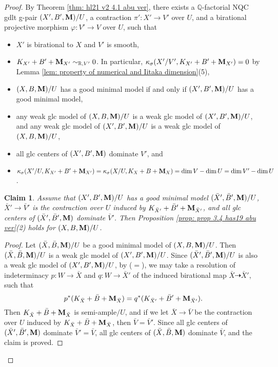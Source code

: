 \documentclass[11pt]{amsart}
\numberwithin{equation}{section}
\newcommand{\Mm}{{\bf{M}}}
\newcommand{\Qq}{\mathbb{Q}}
\newtheorem{claim}[thm]{Claim}
\theoremstyle{definition}
\theoremstyle{definition}
\theoremstyle{definition}
\begin{document}
\begin{proof}
By Theorem \ref{thm: hl21 v2 4.1 abu ver}, there exists a $\Qq$-factorial NQC gdlt g-pair $(X',B',\Mm)/U$, a contraction $\pi': X'\rightarrow V'$ over $U$, and a birational projective morphism $\varphi: V'\rightarrow V$ over $U$, such that 
\begin{itemize}
    \item $X'$ is birational to $X$ and $V'$ is smooth,
    \item $K_{X'}+B'+\Mm_{X'}\sim_{\mathbb R,V'}0$. In particular, $\kappa_{\sigma}(X'/V',K_{X'}+B'+\Mm_{X'})=0$ by Lemma \ref{lem: property of numerical and Iitaka dimension}(5),
    \item $(X,B,\Mm)/U$ has a good minimal model if and only if $(X',B',\Mm)/U$ has a good minimal model,
    \item any weak glc model of $(X,B,\Mm)/U$ is a weak glc model of $(X',B',\Mm)/U$, and any weak glc model of $(X',B',\Mm)/U$ is a  weak glc model of $(X,B,\Mm)/U$,
    \item all glc centers of $(X',B',\Mm)$ dominate $V'$, and
    \item $\kappa_{\sigma}(X'/U,K_{X'}+B'+\Mm_{X'})=\kappa_{\sigma}(X/U,K_X+B+\Mm_X)=\dim V-\dim U=\dim V'-\dim U$.
\end{itemize} 
\begin{claim}\label{claim: check last part of prop 3.4 has19 for g pair}
Assume that $(X',B',\Mm)/U$ has a good minimal model $(\bar X',\bar B',\Mm)/U$, $\bar X'\rightarrow \bar V'$ is the contraction over $U$ induced by $K_{\bar X'}+\bar B'+\Mm_{\bar X'}$, and all glc centers of $(\bar X',\bar B',\Mm)$ dominate $\bar V'$. Then Proposition \ref{prop: prop 3.4 has19 abu ver}(2) holds for $(X,B,\Mm)/U$.
\end{claim}
\begin{proof}
Let $(\bar X,\bar B,\Mm)/U$ be a good minimal model of $(X,B,\Mm)/U$. Then $(\bar X,\bar B,\Mm)/U$ is a weak glc model of $(X',B',\Mm)/U$. Since $(\bar X',\bar B',\Mm)/U$ is also a weak glc model of  $(X',B',\Mm)/U$, by \cite[Lemma 3.5(1)]{HL21} ($=$\cite[Version 3, Lemma 3.9(1)]{HL21}), we may take a resolution of indeterminacy $p: W\rightarrow\bar X$ and $q: W\rightarrow\bar X'$ of the induced birational map $\bar X\dashrightarrow\bar X'$, such that 
$$p^*(K_{\bar X}+\bar B+\Mm_{\bar X})=q^*(K_{\bar X'}+\bar B'+\Mm_{\bar X'}).$$
Then $K_{\bar X}+\bar B+\Mm_{\bar X}$ is semi-ample$/U$, and if we let $\bar X\rightarrow\bar V$ be the contraction over $U$ induced by $K_{\bar X}+\bar B+\Mm_{\bar X}$, then $\bar V=\bar V'$. Since all glc centers of $(\bar X',\bar B',\Mm)$ dominate $\bar V'=\bar V$, all glc centers of  $(\bar X,\bar B,\Mm)$ dominate $\bar V$, and the claim is proved.

\end{proof}
\end{proof}
\end{document}
